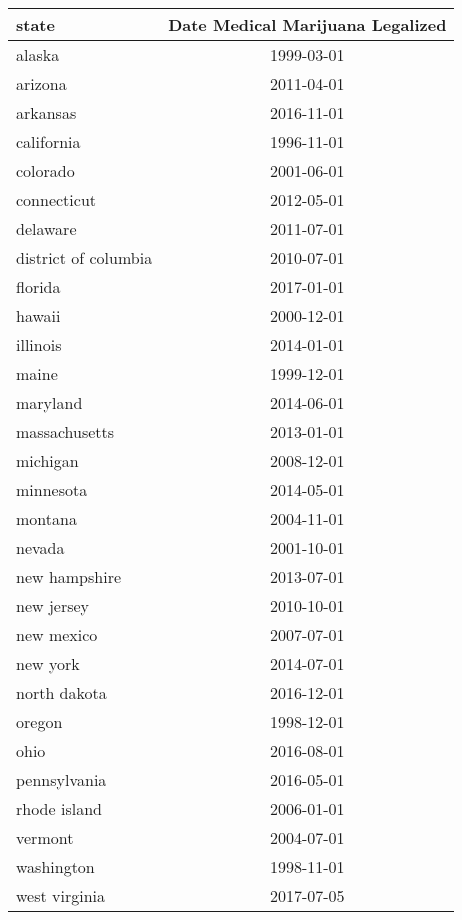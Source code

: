 \begin{tabular}{lc}
  \hline
state & Date Medical Marijuana Legalized \\ 
  \hline
alaska & 1999-03-01 \\ 
  arizona & 2011-04-01 \\ 
  arkansas & 2016-11-01 \\ 
  california & 1996-11-01 \\ 
  colorado & 2001-06-01 \\ 
  connecticut & 2012-05-01 \\ 
  delaware & 2011-07-01 \\ 
  district of columbia & 2010-07-01 \\ 
  florida & 2017-01-01 \\ 
  hawaii & 2000-12-01 \\ 
  illinois & 2014-01-01 \\ 
  maine & 1999-12-01 \\ 
  maryland & 2014-06-01 \\ 
  massachusetts & 2013-01-01 \\ 
  michigan & 2008-12-01 \\ 
  minnesota & 2014-05-01 \\ 
  montana & 2004-11-01 \\ 
  nevada & 2001-10-01 \\ 
  new hampshire & 2013-07-01 \\ 
  new jersey & 2010-10-01 \\ 
  new mexico & 2007-07-01 \\ 
  new york & 2014-07-01 \\ 
  north dakota & 2016-12-01 \\ 
  oregon & 1998-12-01 \\ 
  ohio & 2016-08-01 \\ 
  pennsylvania & 2016-05-01 \\ 
  rhode island & 2006-01-01 \\ 
  vermont & 2004-07-01 \\ 
  washington & 1998-11-01 \\ 
  west virginia & 2017-07-05 \\ 
   \hline
\end{tabular}
